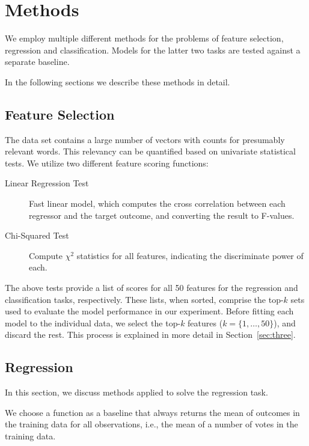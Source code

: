 \section{Methods}
\label{sec:two}

We employ multiple different methods for the problems of feature selection,
regression and classification.  Models for the latter two tasks are tested
against a separate baseline.

In the following sections we describe these methods in detail.

\subsection{Feature Selection}

The data set contains a large number of vectors with counts for presumably
relevant words.  This relevancy can be quantified based on univariate
statistical tests.  We utilize two different feature scoring functions:

\begin{description}
\item[Linear Regression Test] Fast linear model, which computes the cross
  correlation between each regressor and the target outcome, and converting the
  result to F-values.
\item[Chi-Squared Test] Compute $\chi^2$ statistics for all features,
  indicating the discriminate power of each.
\end{description}

The above tests provide a list of scores for all 50 features for the regression
and classification tasks, respectively.  These lists, when sorted, comprise the
top-$k$ sets used to evaluate the model performance in our experiment.  Before
fitting each model to the individual data, we select the top-$k$ features ($k =
\{1, \ldots, 50\}$), and discard the rest.  This process is explained in more
detail in Section~\ref{sec:three}.

\subsection{Regression}

In this section, we discuss methods applied to solve the regression task.

We choose a function as a baseline that always returns the mean of outcomes in
the training data for all observations, i.e., the mean of a number of votes in
the training data.

